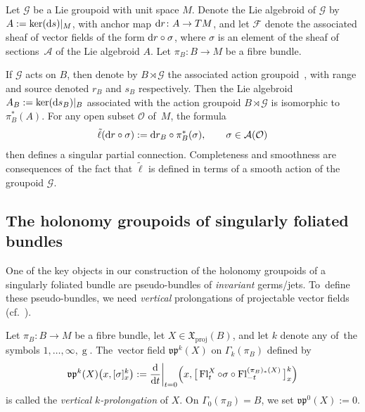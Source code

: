 \documentclass[10pt,a4paper]{amsart}
\numberwithin{equation}{section}
\def\g{\operatorname{g}}
\def\proj{\operatorname{proj}}
\def\Fl{\operatorname{Fl}}
\def\FF{{\mathcal{F}}}
\def\AA{{\mathcal{A}}}
\def\GG{{\mathcal{G}}}
\def\OO{{\mathcal{O}}}
\def\XF{{\mathfrak{X}}}
\def\vpf{{\mathfrak{vp}}}
\begin{document}
\begin{Example}\label{equiex}
Let $\GG$ be a Lie groupoid with unit space $M$. Denote the Lie algebroid of $\GG$ by $A:=\ker({\rm d}s)|_{M}$, with anchor map ${\rm d}r\colon A\rightarrow TM$, and let $\FF$ denote the associated sheaf of vector fields of the form ${\rm d}r\circ\sigma$, where $\sigma$ is an element of the sheaf of sections~$\AA$ of the Lie algebroid $A$. Let $\pi_{B}\colon B\rightarrow M$ be a fibre bundle.

If $\GG$ acts on $B$, then denote by $B\rtimes\GG$ the associated action groupoid~\cite[Example 2.2]{aac1}, with range and source denoted $r_{B}$ and $s_{B}$ respectively. Then the Lie algebroid $A_{B}:=\ker({\rm d}s_{B})|_{B}$ associated with the action groupoid $B\rtimes\GG$ is isomorphic to $\pi_{B}^{*}(A)$. For any open subset $\OO$ of~$M$, the formula
\begin{gather*}
\tilde{\ell}({\rm d}r\circ\sigma):={\rm d}r_{B}\circ\pi_{B}^{*}(\sigma),\qquad \sigma\in\AA(\OO)
\end{gather*}
then defines a singular partial connection. Completeness and smoothness are consequences of~the fact that $\tilde{\ell}$ is defined in terms of a smooth action of the groupoid $\GG$.
\end{Example}


\subsection{The holonomy groupoids of singularly foliated bundles}

One of the key objects in our construction of the holonomy groupoids of a singularly foliated bundle are pseudo-bundles of \textit{invariant} germs/jets. To~define these pseudo-bundles, we need \textit{vertical} prolongations of projectable vector fields (cf.~\cite[Definition~1.15]{varbi}).

\begin{Definition}
Let $\pi_{B}\colon B\rightarrow M$ be a fibre bundle, let $X\in\XF_{\proj}(B)$, and let $k$ denote any of~the symbols $1,\dots,\infty,\g$. The~vector field $\vpf^{k}(X)$ on $\Gamma_{k}(\pi_{B})$ defined by
\begin{gather*}
\vpf^{k}(X)\big(x,[\sigma]^{k}_{x}\big):=\frac{\rm d}{{\rm d}t}\bigg|_{t=0}\Big(x,\big[\Fl^{X}_{t}\circ\sigma\circ\Fl^{(\pi_{B})_{*}(X)}_{-t}\big]_{x}^{k}\Big)
\end{gather*}
is called the \textit{vertical $k$-prolongation} of $X$. On $\Gamma_{0}(\pi_{B}) = B$, we set $\vpf^{0}(X):=0$.
\end{Definition}
\end{document}
